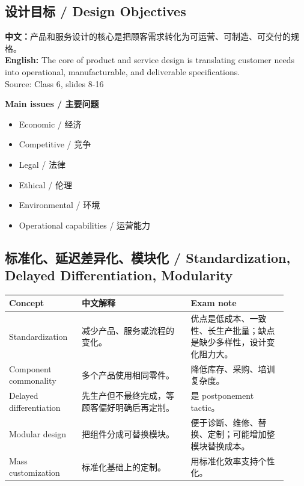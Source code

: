 \documentclass[10pt,a4paper]{ctexart}
\newcommand{\source}[1]{\textcolor{Muted}{\footnotesize Source: #1}}
\newcommand{\cn}[1]{\textbf{中文：}#1}
\newcommand{\en}[1]{\textbf{English:} #1}
\begin{document}
\subsection{设计目标 / Design Objectives}
\cn{产品和服务设计的核心是把顾客需求转化为可运营、可制造、可交付的规格。}\\
\en{The core of product and service design is translating customer needs into operational, manufacturable, and deliverable specifications.}\\
\source{Class 6, slides 8-16}

\textbf{Main issues / 主要问题}
\begin{multicols}{2}
\begin{itemize}
  \item Economic / 经济
  \item Competitive / 竞争
  \item Legal / 法律
  \item Ethical / 伦理
  \item Environmental / 环境
  \item Operational capabilities / 运营能力
\end{itemize}
\end{multicols}

\subsection{标准化、延迟差异化、模块化 / Standardization, Delayed Differentiation, Modularity}
\label{subsec:standardization}

\begin{longtable}{@{}L{0.24\linewidth}L{0.36\linewidth}L{0.32\linewidth}@{}}
\toprule
\textbf{Concept} & \textbf{中文解释} & \textbf{Exam note} \\
\midrule
Standardization & 减少产品、服务或流程的变化。 & 优点是低成本、一致性、长生产批量；缺点是缺少多样性，设计变化阻力大。 \\
Component commonality & 多个产品使用相同零件。 & 降低库存、采购、培训复杂度。 \\
Delayed differentiation & 先生产但不最终完成，等顾客偏好明确后再定制。 & 是 postponement tactic。 \\
Modular design & 把组件分成可替换模块。 & 便于诊断、维修、替换、定制；可能增加整模块替换成本。 \\
Mass customization & 标准化基础上的定制。 & 用标准化效率支持个性化。 \\
\bottomrule
\end{longtable}
\end{document}
